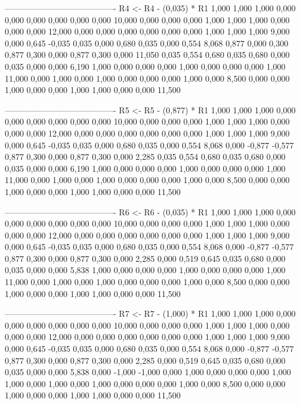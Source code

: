 \documentclass[12pt]{article}
\begin{document}
\begin{enumerate}
\begin{keluaran}
----------------------------------------
R4 <- R4 - (0,035) * R1
1,000   1,000   1,000   0,000   0,000   0,000   0,000   0,000   0,000   10,000
0,000   0,000   0,000   1,000   1,000   1,000   0,000   0,000   0,000   12,000
0,000   0,000   0,000   0,000   0,000   0,000   1,000   1,000   1,000   9,000
0,000   0,645   -0,035  0,035   0,000   0,680   0,035   0,000   0,554   8,068
0,877   0,000   0,300   0,877   0,300   0,000   0,877   0,300   0,000   11,050
0,035   0,554   0,680   0,035   0,680   0,000   0,035   0,000   0,000   6,190
1,000   0,000   0,000   0,000   1,000   0,000   0,000   0,000   1,000   11,000
0,000   1,000   0,000   1,000   0,000   0,000   0,000   1,000   0,000   8,500
0,000   0,000   1,000   0,000   0,000   1,000   1,000   0,000   0,000   11,500

----------------------------------------
R5 <- R5 - (0,877) * R1
1,000   1,000   1,000   0,000   0,000   0,000   0,000   0,000   0,000   10,000
0,000   0,000   0,000   1,000   1,000   1,000   0,000   0,000   0,000   12,000
0,000   0,000   0,000   0,000   0,000   0,000   1,000   1,000   1,000   9,000
0,000   0,645   -0,035  0,035   0,000   0,680   0,035   0,000   0,554   8,068
0,000   -0,877  -0,577  0,877   0,300   0,000   0,877   0,300   0,000   2,285
0,035   0,554   0,680   0,035   0,680   0,000   0,035   0,000   0,000   6,190
1,000   0,000   0,000   0,000   1,000   0,000   0,000   0,000   1,000   11,000
0,000   1,000   0,000   1,000   0,000   0,000   0,000   1,000   0,000   8,500
0,000   0,000   1,000   0,000   0,000   1,000   1,000   0,000   0,000   11,500

----------------------------------------
R6 <- R6 - (0,035) * R1
1,000   1,000   1,000   0,000   0,000   0,000   0,000   0,000   0,000   10,000
0,000   0,000   0,000   1,000   1,000   1,000   0,000   0,000   0,000   12,000
0,000   0,000   0,000   0,000   0,000   0,000   1,000   1,000   1,000   9,000
0,000   0,645   -0,035  0,035   0,000   0,680   0,035   0,000   0,554   8,068
0,000   -0,877  -0,577  0,877   0,300   0,000   0,877   0,300   0,000   2,285
0,000   0,519   0,645   0,035   0,680   0,000   0,035   0,000   0,000   5,838
1,000   0,000   0,000   0,000   1,000   0,000   0,000   0,000   1,000   11,000
0,000   1,000   0,000   1,000   0,000   0,000   0,000   1,000   0,000   8,500
0,000   0,000   1,000   0,000   0,000   1,000   1,000   0,000   0,000   11,500

----------------------------------------
R7 <- R7 - (1,000) * R1
1,000   1,000   1,000   0,000   0,000   0,000   0,000   0,000   0,000   10,000
0,000   0,000   0,000   1,000   1,000   1,000   0,000   0,000   0,000   12,000
0,000   0,000   0,000   0,000   0,000   0,000   1,000   1,000   1,000   9,000
0,000   0,645   -0,035  0,035   0,000   0,680   0,035   0,000   0,554   8,068
0,000   -0,877  -0,577  0,877   0,300   0,000   0,877   0,300   0,000   2,285
0,000   0,519   0,645   0,035   0,680   0,000   0,035   0,000   0,000   5,838
0,000   -1,000  -1,000  0,000   1,000   0,000   0,000   0,000   1,000   1,000
0,000   1,000   0,000   1,000   0,000   0,000   0,000   1,000   0,000   8,500
0,000   0,000   1,000   0,000   0,000   1,000   1,000   0,000   0,000   11,500


\end{keluaran}
\end{enumerate}
\end{document}
